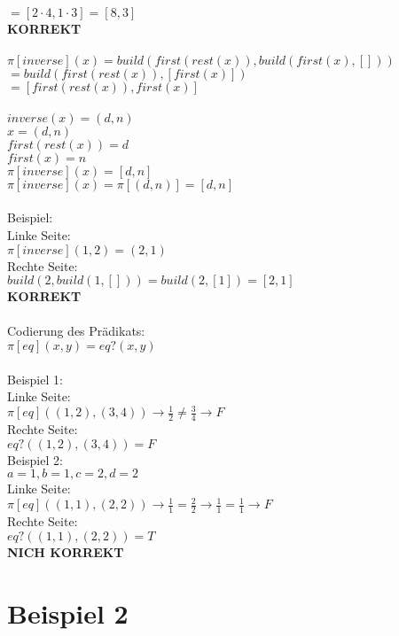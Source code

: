 \documentclass[12pt,runningheads,a4paper]{llncs}
\begin{document}
$= [2\cdot 4, 1 \cdot 3] = [8,3] $\\
\textbf{KORREKT}\\
\\
$\pi[inverse](x) = build(first(rest(x)), build(first(x), []))$\\
$= build(first(rest(x)),[first(x)])$\\
$= [first(rest(x)), first(x)]$\\
\\
$inverse(x) = (d,n)$\\
$x = (d,n)$\\
$first(rest(x)) = d$\\
$first(x) = n$\\
$\pi [inverse](x) = [d,n]$\\
$\pi [inverse](x)= \pi [(d,n)] = [d,n]$\\
\\
Beispiel:\\
Linke Seite:\\
$\pi [inverse](1,2) = (2,1)$\\
Rechte Seite: \\
$build(2, build(1, [])) = build(2, [1]) = [2,1]$\\
\textbf{KORREKT}\\
\\
Codierung des Prädikats:\\
$\pi[eq](x, y) = eq?(x, y)$\\
\\
Beispiel 1:\\
Linke Seite:\\
$\pi[eq]((1,2),(3,4)) \rightarrow \frac{1}{2} \neq \frac{3}{4} \rightarrow F$\\
Rechte Seite:\\
$eq?((1,2), (3,4)) = F$\\
Beispiel 2: \\
$a = 1, b = 1, c = 2, d = 2$\\
Linke Seite:\\
$\pi[eq]((1,1),(2,2)) \rightarrow \frac{1}{1} = \frac{2}{2} \rightarrow \frac{1}{1} = \frac{1}{1} \rightarrow F$\\
Rechte Seite:\\
$eq?((1,1), (2,2)) = T$\\
\textbf{NICH KORREKT}\\

\section*{Beispiel 2}
\end{document}
